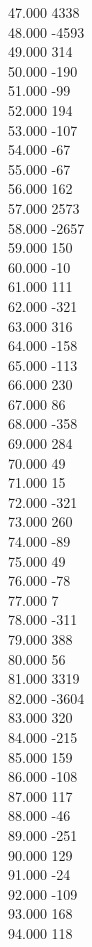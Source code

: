 { 47.000	4338 \\
 48.000	-4593 \\
 49.000	314 \\
 50.000	-190 \\
 51.000	-99 \\
 52.000	194 \\
 53.000	-107 \\
 54.000	-67 \\
 55.000	-67 \\
 56.000	162 \\
 57.000	2573 \\
 58.000	-2657 \\
 59.000	150 \\
 60.000	-10 \\
 61.000	111 \\
 62.000	-321 \\
 63.000	316 \\
 64.000	-158 \\
 65.000	-113 \\
 66.000	230 \\
 67.000	86 \\
 68.000	-358 \\
 69.000	284 \\
 70.000	49 \\
 71.000	15 \\
 72.000	-321 \\
 73.000	260 \\
 74.000	-89 \\
 75.000	49 \\
 76.000	-78 \\
 77.000	7 \\
 78.000	-311 \\
 79.000	388 \\
 80.000	56 \\
 81.000	3319 \\
 82.000	-3604 \\
 83.000	320 \\
 84.000	-215 \\
 85.000	159 \\
 86.000	-108 \\
 87.000	117 \\
 88.000	-46 \\
 89.000	-251 \\
 90.000	129 \\
 91.000	-24 \\
 92.000	-109 \\
 93.000	168 \\
 94.000	118 \\
}
